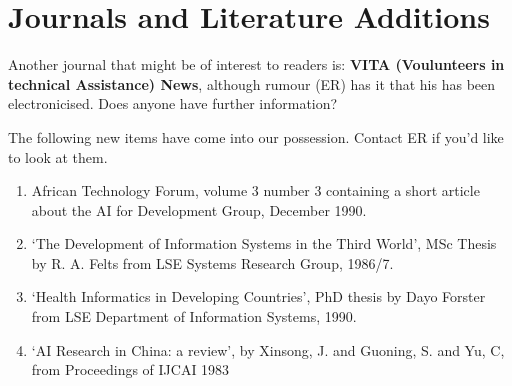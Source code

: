\section{Journals and Literature Additions}
 Another journal that might be of interest to readers is:
 {\bf  VITA (Voulunteers in technical Assistance) News}, although
 rumour (ER) has it that his has been electronicised. Does anyone have
 further information?

The following new items have come into our
possession. Contact ER if you'd like to look at them.
\begin{enumerate}
\item African Technology Forum, volume 3 number 3 containing a short
article about the AI for Development Group, December 1990.
\item `The Development of Information Systems in the Third World', MSc
Thesis by R. A. Felts from LSE Systems Research Group, 1986/7.
\item `Health Informatics in Developing Countries', PhD thesis by Dayo
Forster from LSE Department of Information Systems, 1990.
\item `AI Research in China: a review', by Xinsong, J.
and Guoning, S. and Yu, C, from Proceedings of IJCAI 1983
\end{enumerate}
